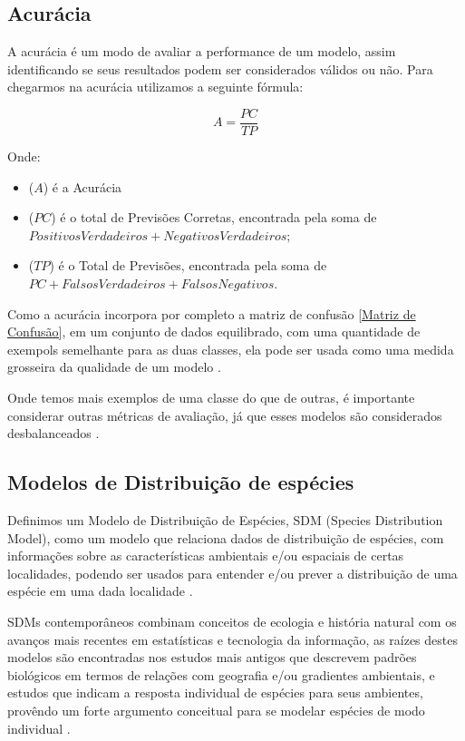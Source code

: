 \documentclass[
    12pt,               %
    openright,          %
    oneside,            %
    a4paper,            %
    english,            %
    brazil              %
    ]{abntex2}
\begin{document}
\subsection{Acurácia}

A acurácia é um modo de avaliar a performance de um modelo, assim identificando se seus resultados podem
ser considerados válidos ou não. Para chegarmos na acurácia utilizamos a seguinte fórmula:

\begin{equation}
    \label{conta_acuracia}
    A = \frac{PC}{TP}
\end{equation}

Onde:
\begin{itemize}
    \item ($A$) é a Acurácia
    \item ($PC$) é o total de Previsões Corretas, encontrada pela soma de $Positivos Verdadeiros + Negativos Verdadeiros$;
    \item ($TP$) é o Total de Previsões, encontrada pela soma de $PC + Falsos Verdadeiros + Falsos Negativos$.
\end{itemize}

Como a acurácia incorpora por completo a matriz de confusão \ref{Matriz de Confusão}, em um conjunto de dados equilibrado, 
com uma quantidade de exempols semelhante para as duas classes, ela pode ser usada como uma medida grosseira da qualidade 
de um modelo \cite{acuracia_matriz}.

Onde temos mais exemplos de uma classe do que de outras, é importante considerar outras métricas de avaliação, já que esses
modelos são considerados desbalanceados \cite{acuracia}.

\subsection{Modelos de Distribuição de espécies}

Definimos um Modelo de Distribuição de Espécies, SDM (Species Distribution Model), como um modelo que relaciona dados de 
distribuição de espécies, com informações sobre as características ambientais e/ou espaciais de certas localidades, podendo 
ser usados para entender e/ou prever a distribuição de uma espécie em uma dada localidade \cite{speciesDistributionModels}.

SDMs contemporâneos combinam conceitos de ecologia e história natural com os avanços mais recentes em estatísticas e 
tecnologia da informação, as raízes destes modelos são encontradas nos estudos mais antigos que descrevem padrões biológicos 
em termos de relações com geografia e/ou gradientes ambientais, e estudos que indicam a resposta individual de espécies 
para seus ambientes, provêndo um forte argumento conceitual para se modelar espécies de modo individual \cite{speciesDistributionModels}.
\end{document}
